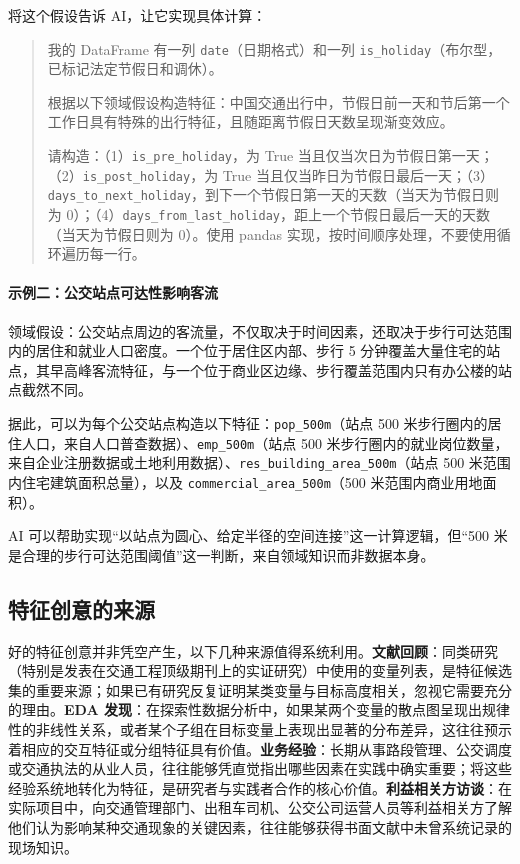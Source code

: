 将这个假设告诉 AI，让它实现具体计算：

\begin{quote}
我的 DataFrame 有一列 \texttt{date}（日期格式）和一列 \texttt{is\_holiday}（布尔型，已标记法定节假日和调休）。

根据以下领域假设构造特征：中国交通出行中，节假日前一天和节后第一个工作日具有特殊的出行特征，且随距离节假日天数呈现渐变效应。

请构造：（1）\texttt{is\_pre\_holiday}，为 True 当且仅当次日为节假日第一天；（2）\texttt{is\_post\_holiday}，为 True 当且仅当昨日为节假日最后一天；（3）\texttt{days\_to\_next\_holiday}，到下一个节假日第一天的天数（当天为节假日则为 0）；（4）\texttt{days\_from\_last\_holiday}，距上一个节假日最后一天的天数（当天为节假日则为 0）。使用 pandas 实现，按时间顺序处理，不要使用循环遍历每一行。
\end{quote}

\paragraph{示例二：公交站点可达性影响客流}

领域假设：公交站点周边的客流量，不仅取决于时间因素，还取决于步行可达范围内的居住和就业人口密度。一个位于居住区内部、步行 5 分钟覆盖大量住宅的站点，其早高峰客流特征，与一个位于商业区边缘、步行覆盖范围内只有办公楼的站点截然不同。

据此，可以为每个公交站点构造以下特征：\texttt{pop\_500m}（站点 500 米步行圈内的居住人口，来自人口普查数据）、\texttt{emp\_500m}（站点 500 米步行圈内的就业岗位数量，来自企业注册数据或土地利用数据）、\texttt{res\_building\_area\_500m}（站点 500 米范围内住宅建筑面积总量），以及 \texttt{commercial\_area\_500m}（500 米范围内商业用地面积）。

AI 可以帮助实现“以站点为圆心、给定半径的空间连接”这一计算逻辑，但“500 米是合理的步行可达范围阈值”这一判断，来自领域知识而非数据本身。

\subsection{特征创意的来源}

好的特征创意并非凭空产生，以下几种来源值得系统利用。\textbf{文献回顾}：同类研究（特别是发表在交通工程顶级期刊上的实证研究）中使用的变量列表，是特征候选集的重要来源；如果已有研究反复证明某类变量与目标高度相关，忽视它需要充分的理由。\textbf{EDA 发现}：在探索性数据分析中，如果某两个变量的散点图呈现出规律性的非线性关系，或者某个子组在目标变量上表现出显著的分布差异，这往往预示着相应的交互特征或分组特征具有价值。\textbf{业务经验}：长期从事路段管理、公交调度或交通执法的从业人员，往往能够凭直觉指出哪些因素在实践中确实重要；将这些经验系统地转化为特征，是研究者与实践者合作的核心价值。\textbf{利益相关方访谈}：在实际项目中，向交通管理部门、出租车司机、公交公司运营人员等利益相关方了解他们认为影响某种交通现象的关键因素，往往能够获得书面文献中未曾系统记录的现场知识。


